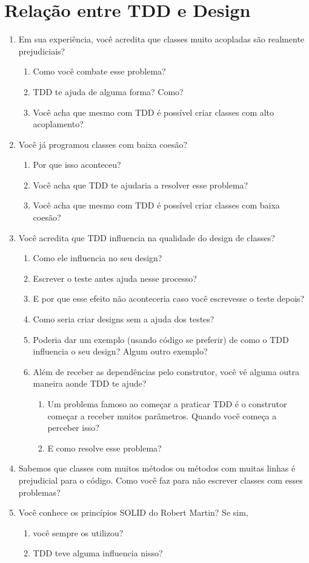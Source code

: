 \section{Relação entre TDD e Design}

\begin{enumerate}
	\item{Em sua experiência, você acredita que classes muito acopladas são realmente prejudiciais?}
		\begin{enumerate}
			\item Como você combate esse problema?
			\item TDD te ajuda de alguma forma? Como?
			\item Você acha que mesmo com TDD é possível criar classes com alto acoplamento? 
		\end{enumerate}
	\item{Você já programou classes com baixa coesão?}
		\begin{enumerate}
			\item Por que isso aconteceu?
			\item Você acha que TDD te ajudaria a resolver esse problema?
			\item Você acha que mesmo com TDD é possível criar classes com baixa coesão? 
		\end{enumerate}
	\item Você acredita que TDD influencia na qualidade do design de classes?
	\begin{enumerate}
		\item Como ele influencia no seu design?
		\item Escrever o teste antes ajuda nesse processo?
		\item E por que esse efeito não aconteceria caso você escrevesse o teste depois?
		\item Como seria criar designs sem a ajuda dos testes?
		\item Poderia dar um exemplo (usando código se preferir) de como o TDD influencia o seu design? Algum outro exemplo?
		\item Além de receber as dependências pelo construtor, você vê alguma outra maneira aonde TDD te ajude?
			\begin{enumerate}
				\item Um problema famoso ao começar a praticar TDD é o construtor começar a receber muitos parâmetros. Quando você começa a perceber isso?
				\item E como resolve esse problema?
			\end{enumerate}
	\end{enumerate}
	\item Sabemos que classes com muitos métodos ou métodos com muitas linhas é prejudicial para o código. Como você faz para não escrever classes com esses problemas?
	\item Você conhece os princípios SOLID do Robert Martin? Se sim,
	\begin{enumerate}
		\item você sempre os utilizou?
		\item TDD teve alguma influencia nisso?
	\end{enumerate}
\end{enumerate}

